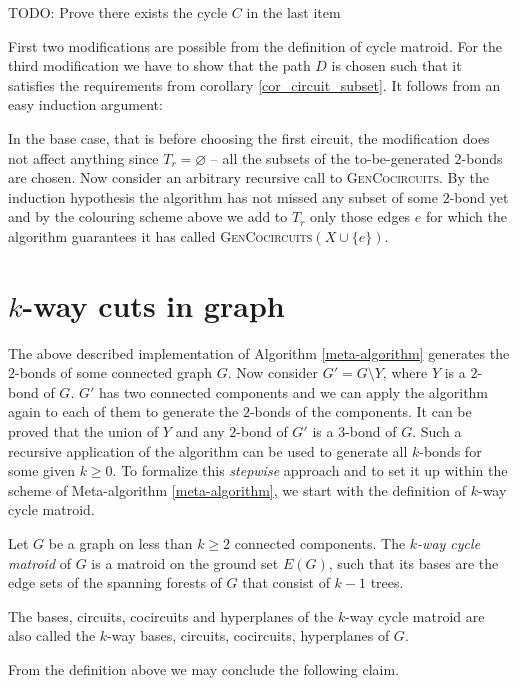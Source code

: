 TODO: Prove there exists the cycle $C$ in the last item

First two modifications are possible from the definition of cycle matroid. For the third modification we have to show that the path $D$ is chosen such that it satisfies the requirements from corollary \ref{cor_circuit_subset}. It follows from an easy induction argument:

In the base case, that is before choosing the first circuit, the modification does not affect anything since $T_r = \varnothing$ -- all the subsets of the to-be-generated $2$-bonds are chosen. Now consider an arbitrary recursive call to \textsc{GenCocircuits}. By the induction hypothesis the algorithm has not missed any subset of some $2$-bond yet and by the colouring scheme above we add to $T_r$ only those edges $e$ for which the algorithm guarantees it has called \textsc{GenCocircuits}$(X \cup \{e\})$.

\section{$k$-way cuts in graph}

The above described implementation of Algorithm \ref{meta-algorithm} generates the $2$-bonds of some connected graph $G$. Now consider $G' = G \setminus Y$, where $Y$ is a $2$-bond of $G$. $G'$ has two connected components and we can apply the algorithm again to each of them to generate the $2$-bonds of the components. It can be proved that the union of $Y$ and any $2$-bond of $G'$ is a $3$-bond of $G$. Such a recursive application of the algorithm can be used to generate all $k$-bonds for some given $k \geq 0$. To formalize this \textit{stepwise} approach and to set it up within the scheme of Meta-algorithm \ref{meta-algorithm}, we start with the definition of $k$-way cycle matroid.

\begin{defn}
	\label{kway_cycle_matroid}
	Let $G$ be a graph on less than $k \geq 2$ connected components. The \textit{$k$-way cycle matroid} of $G$ is a matroid on the ground set $E(G)$, such that its bases are the edge sets of the spanning forests of $G$ that consist of $k-1$ trees.

	The bases, circuits, cocircuits and hyperplanes of the $k$-way cycle matroid are also called the $k$-way bases, circuits, cocircuits, hyperplanes of $G$.
\end{defn}

From the definition above we may conclude the following claim.

